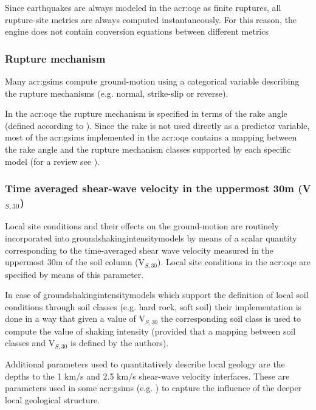 Since earthquakes are always modeled in the \gls{acr:oqe} as finite ruptures, 
all rupture-site metrics are always computed instantaneously. For this reason,
the engine does not contain conversion equations between different metrics
\parencite[see for example][]{scherbaum2004}
% 
\subsubsection{Rupture mechanism}
Many \glspl{acr:gsim} compute ground-motion using a 
categorical variable describing the rupture mechanisms (e.g. normal,
strike-slip or reverse).

In the \gls{acr:oqe} the rupture mechanism is specified 
in terms of the rake angle (defined according to \cite{aki2002}). 
%
Since the rake is not used directly as a predictor variable,
most of the \glspl{acr:gsim} implemented in the \gls{acr:oqe} contains 
a mapping between the rake angle and the rupture mechanism classes 
supported by each specific model (for a review see 
\cite[page 24 of][]{akkar2013r}).
% 
\subsubsection{Time averaged shear-wave velocity in the uppermost 30m 
(V$_{S,30}$)}
%
Local site conditions and their effects on the ground-motion are routinely 
incorporated into \glspl{groundshakingintensitymodel} by means of a scalar
quantity corresponding to the time-averaged shear wave velocity measured 
in the uppermost 30m of the soil column (V$_{S,30}$).
%
Local site conditions in the \gls{acr:oqe} are specified by means of this
parameter.

In case of \glspl{groundshakingintensitymodel} which support the definition 
of local soil conditions through soil classes (e.g. hard rock, soft soil) 
their implementation is done in a way that given a value of V$_{S,30}$ the
corresponding soil class is used to compute the value of shaking intensity 
(provided that a mapping between soil classes and V$_{S,30}$ is defined 
by the authors).

Additional parameters used to quantitatively describe local geology are 
the depths to the 1 km/s and 2.5 km/s shear-wave velocity interfaces. 
These are parameters used in some \glspl{acr:gsim} (e.g. \cite{chiou2008}) 
to capture the influence of the deeper local geological structure. 
%
